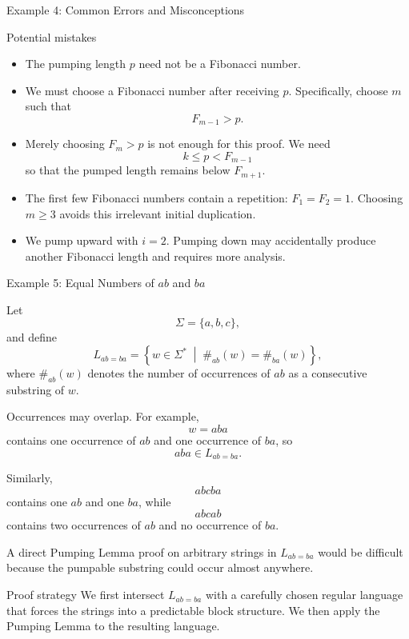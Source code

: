 \documentclass[10pt,aspectratio=169]{beamer}
\begin{document}
\begin{frame}{Example 4: Common Errors and Misconceptions}

\small
\begin{alertblock}{Potential mistakes}
\begin{itemize}
    \item The pumping length \(p\) need not be a Fibonacci number.

    \item We must choose a Fibonacci number after receiving \(p\).
    Specifically, choose \(m\) such that
    \[
    F_{m-1}>p.
    \]

    \item Merely choosing \(F_m>p\) is not enough for this proof.
    We need
    \[
    k\leq p<F_{m-1}
    \]
    so that the pumped length remains below \(F_{m+1}\).

    \item The first few Fibonacci numbers contain a repetition:
    \(
    F_1=F_2=1.
    \)
    Choosing \(m\geq 3\) avoids this irrelevant initial duplication.

    \item We pump upward with \(i=2\). Pumping down may accidentally
    produce another Fibonacci length and requires more analysis.
\end{itemize}
\end{alertblock}

\end{frame}


\begin{frame}{Example 5: Equal Numbers of \(ab\) and \(ba\)}

\small
Let
\[
\Sigma=\{a,b,c\},
\]
and define
\[
L_{ab=ba}
=
\left\{
w\in\Sigma^*
\;\middle|\;
\#_{ab}(w)=\#_{ba}(w)
\right\},
\]
where \(\#_{ab}(w)\) denotes the number of occurrences of \(ab\) as
a consecutive substring of \(w\).

\vspace{0.4em}
Occurrences may overlap. For example,
\[
w=aba
\]
contains one occurrence of \(ab\) and one occurrence of \(ba\), so
\[
aba\in L_{ab=ba}.
\]

Similarly,
\[
abcba
\]
contains one \(ab\) and one \(ba\), while
\[
abcab
\]
contains two occurrences of \(ab\) and no occurrence of \(ba\).

\vspace{0.4em}
A direct Pumping Lemma proof on arbitrary strings in \(L_{ab=ba}\)
would be difficult because the pumpable substring could occur almost
anywhere.

\begin{block}{Proof strategy}
We first intersect \(L_{ab=ba}\) with a carefully chosen regular
language that forces the strings into a predictable block structure.
We then apply the Pumping Lemma to the resulting language.
\end{block}

\end{frame}
\end{document}
